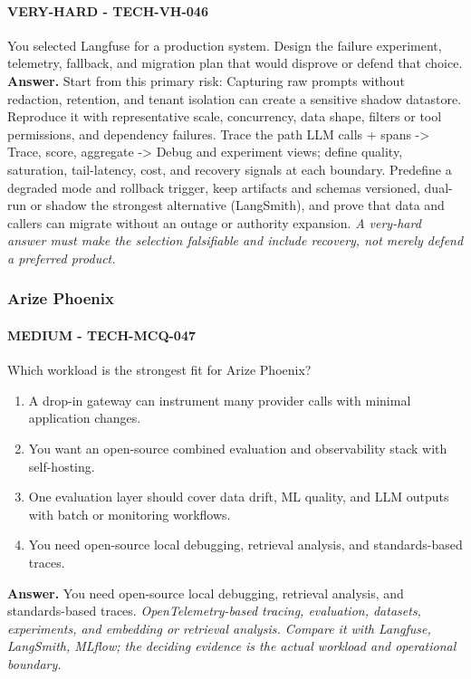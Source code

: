 \paragraph{VERY-HARD - TECH-VH-046} You selected Langfuse for a production system. Design the failure experiment, telemetry, fallback, and migration plan that would disprove or defend that choice.
\textbf{Answer.} Start from this primary risk: Capturing raw prompts without redaction, retention, and tenant isolation can create a sensitive shadow datastore. Reproduce it with representative scale, concurrency, data shape, filters or tool permissions, and dependency failures. Trace the path LLM calls + spans -> Trace, score, aggregate -> Debug and experiment views; define quality, saturation, tail-latency, cost, and recovery signals at each boundary. Predefine a degraded mode and rollback trigger, keep artifacts and schemas versioned, dual-run or shadow the strongest alternative (LangSmith), and prove that data and callers can migrate without an outage or authority expansion.
\textit{A very-hard answer must make the selection falsifiable and include recovery, not merely defend a preferred product.}
\subsubsection*{Arize Phoenix}
\paragraph{MEDIUM - TECH-MCQ-047} Which workload is the strongest fit for Arize Phoenix?
\begin{enumerate}[label=\Alph*.]
\item A drop-in gateway can instrument many provider calls with minimal application changes.
\item You want an open-source combined evaluation and observability stack with self-hosting.
\item One evaluation layer should cover data drift, ML quality, and LLM outputs with batch or monitoring workflows.
\item You need open-source local debugging, retrieval analysis, and standards-based traces.
\end{enumerate}
\textbf{Answer.} You need open-source local debugging, retrieval analysis, and standards-based traces.
\textit{OpenTelemetry-based tracing, evaluation, datasets, experiments, and embedding or retrieval analysis. Compare it with Langfuse, LangSmith, MLflow; the deciding evidence is the actual workload and operational boundary.}
